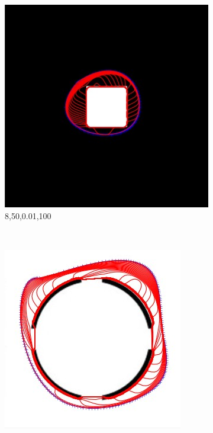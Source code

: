 \documentclass[paper=a4, fontsize=11pt]{scrartcl} %
\numberwithin{equation}{section} %
\numberwithin{figure}{section} %
\numberwithin{table}{section} %
\begin{document}
\begin{figure}[H]
        \centering
        \begin{subfigure}[b]{0.2\textwidth}
                \includegraphics[width=\textwidth]{121}
                \caption{8,50,0.01,100}
                \label{fig:Blacksquare9}
        \end{subfigure}%
        ~ %
        \begin{subfigure}[b]{0.2\textwidth}
                \includegraphics[width=\textwidth]{301}

\end{subfigure}
\end{figure}
\end{document}
